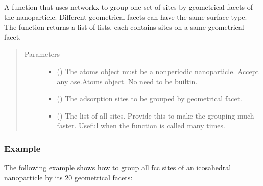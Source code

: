 \documentclass[letterpaper,10pt,english]{sphinxmanual}
\begin{document}

\begin{fulllineitems}
\label{\detokenize{modules:acat.adsorption_sites.group_sites_by_facet}}
A function that uses networkx to group one set of sites by
geometrical facets of the nanoparticle. Different geometrical
facets can have the same surface type. The function returns a
list of lists, each contains sites on a same geometrical facet.
\begin{quote}\begin{description}
\item[{Parameters}] \leavevmode\begin{itemize}
\item {} 
 () \textendash{} The atoms object must be a non\sphinxhyphen{}periodic nanoparticle.
Accept any ase.Atoms object. No need to be built\sphinxhyphen{}in.

\item {} 
 () \textendash{} The adsorption sites to be grouped by geometrical facet.

\item {} 
 (\sphinxstyleliteralemphasis{\sphinxupquote{, }}) \textendash{} The list of all sites. Provide this to make the grouping
much faster. Useful when the function is called many times.

\end{itemize}

\end{description}\end{quote}
\subsubsection*{Example}

The following example shows how to group all fcc sites of an
icosahedral nanoparticle by its 20 geometrical facets:


\end{fulllineitems}
\end{document}
